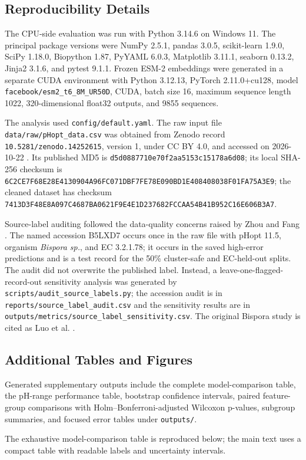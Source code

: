 \subsection{Reproducibility Details}
\label{sec:supplementary-reproducibility}

The CPU-side evaluation was run with Python 3.14.6 on Windows 11. The principal package versions were NumPy 2.5.1, pandas 3.0.5, scikit-learn 1.9.0, SciPy 1.18.0, Biopython 1.87, PyYAML 6.0.3, Matplotlib 3.11.1, seaborn 0.13.2, Jinja2 3.1.6, and pytest 9.1.1. Frozen ESM-2 embeddings were generated in a separate CUDA environment with Python 3.12.13, PyTorch 2.11.0+cu128, model \texttt{facebook/esm2\_t6\_8M\_UR50D}, CUDA, batch size 16, maximum sequence length 1022, 320-dimensional float32 outputs, and 9855 sequences.

The analysis used \texttt{config/default.yaml}. The raw input file \texttt{data/raw/pHopt\_data.csv} was obtained from Zenodo record \texttt{10.5281/zenodo.14252615}, version 1, under CC BY 4.0, and accessed on 2026-10-22 \citep{gado2023phopt}. Its published MD5 is \texttt{d5d0887710e70f2aa5153c15178a6d08}; its local SHA-256 checksum is \texttt{6C2CE7F68E28E4130904A96FC071DBF7FE78E090BD1E408408038F01FA75A3E9}; the cleaned dataset has checksum \texttt{7413D3F48E8A097C4687BA0621F9E4E1D237682FCCAA54B41B952C16E606B3A7}.

Source-label auditing followed the data-quality concerns raised by Zhou and Fang \cite{zhou2026caution}. The named accession B5LXD7 occurs once in the raw file with pHopt 11.5, organism \textit{Bispora sp.}, and EC 3.2.1.78; it occurs in the saved high-error predictions and is a test record for the 50\% cluster-safe and EC-held-out splits. The audit did not overwrite the published label. Instead, a leave-one-flagged-record-out sensitivity analysis was generated by \texttt{scripts/audit\_source\_labels.py}; the accession audit is in \texttt{reports/source\_label\_audit.csv} and the sensitivity results are in \texttt{outputs/metrics/source\_label\_sensitivity.csv}. The original Bispora study is cited as Luo et al. \cite{luo2009novel}.

\subsection{Additional Tables and Figures}
\label{sec:supplementary-additional-results}

Generated supplementary outputs include the complete model-comparison table, the pH-range performance table, bootstrap confidence intervals, paired feature-group comparisons with Holm--Bonferroni-adjusted Wilcoxon p-values, subgroup summaries, and focused error tables under \texttt{outputs/}.

The exhaustive model-comparison table is reproduced below; the main text uses a compact table with readable labels and uncertainty intervals.

